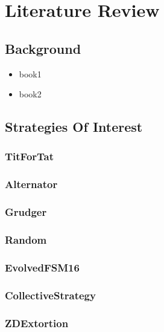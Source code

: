 
\chapter{Literature Review}\label{ch:literature}
\section{Background}\label{sec:background}
    \begin{itemize}
        \item book1
        \item book2
        
    \end{itemize}


\section{Strategies Of Interest}\label{sec:strategiesOfInterest}
\subsection{TitForTat}
\subsection{Alternator}
\subsection{Grudger}
\subsection{Random}
\subsection{EvolvedFSM16}
\subsection{CollectiveStrategy}
\subsection{ZDExtortion}